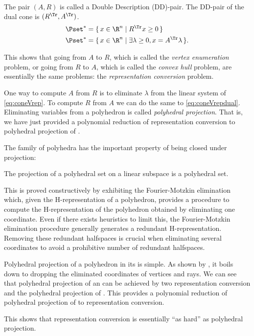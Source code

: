 \documentclass[11pt,twoside,a4paper,openright]{uclouvain-thesis}
\begin{document}
The pair $(A, R)$ is called a Double Description (DD)-pair.
The DD-pair of the dual cone is $(R^\Tr, A^\Tr)$.
\begin{align}
  \label{eq:coneHrepdual}
  \Pset^* & = \{\, x \in \R^n \mid R^\Tr x \geq 0 \,\}\\
  \label{eq:coneVrepdual}
  \Pset^* & = \{\, x \in \R^n \mid \exists \lambda \geq 0, x = A^\Tr\lambda \,\}.
\end{align}

This shows that going from $A$ to $R$, which is called the \emph{vertex enumeration} problem, or going from $R$ to $A$, which is called the \emph{convex hull} problem, are essentially the same problems: the \emph{representation conversion} problem.

One way to compute $A$ from $R$ is to eliminate $\lambda$ from the linear system of \eqref{eq:coneVrep}.
To compute $R$ from $A$ we can do the same to \eqref{eq:coneVrepdual}.
Eliminating variables from a polyhedron is called \emph{polyhedral projection}.
That is, we have just provided a polynomial reduction of representation conversion to polyhedral projection of \hrep{}.

The family of polyhedra has the important property of being closed under projection:
\begin{mytheo}
  \label{theo:fourier_motzkin}
  The projection of a polyhedral set on a linear subspace is a polyhedral set.
\end{mytheo}
This is proved constructively by exhibiting the Fourier-Motzkin elimination
which,
given the H-representation of a polyhedron,
provides a procedure to compute the H-representation of the polyhedron obtained by eliminating one coordinate.
Even if there exists heuristics to limit this, the Fourier-Motzkin elimination procedure
generally generates a redundant H-representation.
Removing these redundant halfspaces is crucial when eliminating several coordinates
to avoid a prohibitive number of redundant halfspaces.

Polyhedral projection of a polyhedron in its \vrep{} is simple.
As shown by , it boils down to dropping the eliminated coordinates of vertices and rays.
We can see that polyhedral projection of an \hrep{} can be achieved by two representation conversion and the polyhedral projection of \vrep{}.
This provides a polynomial reduction of polyhedral projection of \hrep{} to representation conversion.

This shows that representation conversion is essentially ``as hard'' as polyhedral projection.
\end{document}
